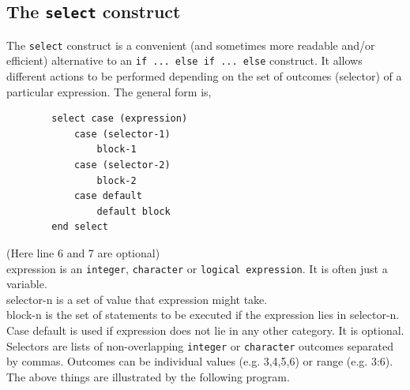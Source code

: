 \documentclass[12pt,oneside]{book}
\newcommand{\code}[1]{\lstinline[keywordstyle=\color{black},basicstyle=\ttfamily]{#1}}
\begin{document}
    \subsection{The \code{select} construct}
    The \code{select} construct is a convenient (and sometimes more readable and/or efficient) alternative to an \code{if ... else if ... else} construct.
    It allows different actions to be performed depending on the set of outcomes (selector) of a particular expression. 
    The general form is,
    \begin{lstlisting}
        select case (expression)
            case (selector-1)
                block-1
            case (selector-2)
                block-2
            case default
                default block
        end select
    \end{lstlisting}
    (Here line 6 and 7 are optional)\\
    expression is an \code{integer}, \code{character} or \code{logical expression}. It is often just a variable.\\
    selector-n is a set of value that expression might take.\\
    block-n is the set of statements to be executed if the expression lies in selector-n.\\
    Case default is used if expression does not lie in any other category. It is optional.\\
    Selectors are lists of non-overlapping \code{integer} or \code{character} outcomes separated by commas. Outcomes can be individual values (e.g. 3,4,5,6) or range (e.g. 3:6).
    The above things are illustrated by the following program.
    
\end{document}
